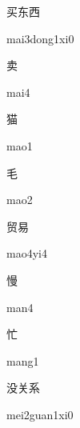 \begin{verbete}{买东西}
\begin{pronuncia}{mai3dong1xi0}
\end{pronuncia}
\end{verbete}

\begin{verbete}[mai4]{卖}
\begin{pronuncia}{mai4}
\end{pronuncia}
\end{verbete}

\begin{verbete}[mao1]{猫}
\begin{pronuncia}{mao1}
\end{pronuncia}
\end{verbete}

\begin{verbete}[mao2]{毛}
\begin{pronuncia}{mao2}
\end{pronuncia}
\end{verbete}

\begin{verbete}[mao4yi4]{贸易}
\begin{pronuncia}{mao4yi4}
\end{pronuncia}
\end{verbete}

\begin{verbete}[man4]{慢}
\begin{pronuncia}{man4}
\end{pronuncia}
\end{verbete}

\begin{verbete}[mang1]{忙}
\begin{pronuncia}{mang1}
\end{pronuncia}
\end{verbete}

\begin{verbete}{没关系}
\begin{pronuncia}{mei2guan1xi0}
\end{pronuncia}
\end{verbete}

